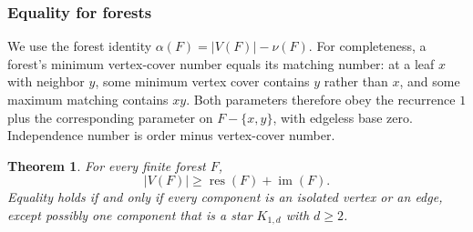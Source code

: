 \documentclass[11pt,a4paper]{article}
\newtheorem{theorem}{Theorem}[section]
\theoremstyle{definition}\newtheorem{definition}[theorem]{Definition}
\theoremstyle{remark}\newtheorem{remark}[theorem]{Remark}
\newcommand{\res}{\operatorname{res}}
\newcommand{\im}{\operatorname{im}}
\begin{document}
\subsubsection{Equality for forests}

We use the forest identity $\alpha(F)=|V(F)|-\nu(F)$. For completeness, a
forest's minimum vertex-cover number equals its matching number: at a leaf
$x$ with neighbor $y$, some minimum vertex cover contains $y$ rather than
$x$, and some maximum matching contains $xy$. Both parameters therefore obey
the recurrence $1$ plus the corresponding parameter on $F-\{x,y\}$, with
edgeless base zero. Independence number is order minus vertex-cover number.

\begin{theorem}\label{late:forest:thm:forest}
For every finite forest $F$,
\begin{equation}\label{late:forest:eq:forest}
|V(F)|\ge \res(F)+\im(F).
\end{equation}
Equality holds if and only if every component is an isolated vertex or an
edge, except possibly one component that is a star $K_{1,d}$ with $d\ge2$.
\end{theorem}
\end{document}
